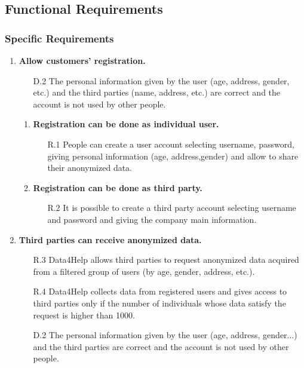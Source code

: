 \documentclass[a4paper]{article}
\begin{document}
    \clearpage
    
    \subsection{Functional Requirements}
    
    \subsubsection{Specific Requirements}
    \begin{enumerate}[label*=\bf{G.\arabic*}]
        
        \item \textbf{Allow customers’ registration.}
        \begin{enumerate}
            \item [D.2] The personal information given by the user (age, address, gender, etc.) and the third parties (name, address, etc.) are correct and the account is not used by other people. 
        \end{enumerate}
        
        \begin{enumerate}[label*=\bf{.\arabic*}]
            \item \textbf{Registration can be done as individual user.}
            \begin{enumerate}
                \item [R.1] People can create a user account selecting username, password, giving personal information (age, address,gender) and allow to share their anonymized data.
                
            \end{enumerate}
            
            \item \textbf{Registration can be done as third party.}
            \begin{enumerate}
                \item [R.2] It is possible to create a third party account selecting username and password and giving the company main information.
            \end{enumerate}
        \end{enumerate}
        
        \item \textbf{Third parties can receive anonymized data.}
                
        \begin{enumerate}
            \item [R.3] Data4Help allows third parties to request anonymized data acquired from a filtered group of users (by age, gender, address, etc.).
            \item [R.4] Data4Help collects data from registered users and gives access to third parties only if the number of individuals whose data satisfy the request is higher than 1000.
            \item [D.2] The personal information given by the user (age, address, gender...) and the third parties are correct and the account is not used by other people.
        \end{enumerate}
            

\end{enumerate}
\end{document}

